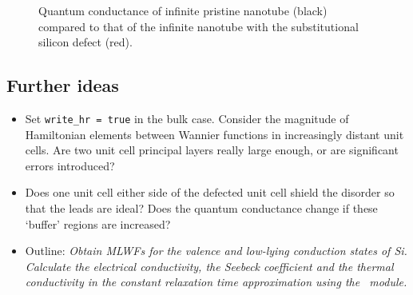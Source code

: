 \documentclass[a4paper,11pt,twoside]{article}
\begin{document}
\begin{figure}[h]
\begin{center}
\caption{Quantum conductance of infinite pristine nanotube (black) 
compared to that of the infinite nanotube with the substitutional silicon 
defect (red).}
\label{fig:cnt_qc}
\end{center}
\end{figure}

\subsection*{Further ideas}
\begin{itemize}
\item Set {\tt write\_hr = true} in the bulk case. Consider the magnitude of Hamiltonian 
	elements between Wannier functions in increasingly distant unit cells. Are two 
	unit cell principal layers really large enough, or are significant errors introduced?
\item Does one unit cell either side of the defected unit cell shield the disorder
	so that the leads are ideal? Does the quantum conductance change if these 
	`buffer' regions are increased?
\end{itemize}


\begin{itemize}
\item{Outline: \it{Obtain MLWFs for the valence and low-lying
    conduction states of Si. Calculate the electrical conductivity, the
    Seebeck coefficient and the thermal conductivity in the constant
    relaxation time approximation using the \bw\ module.}} 
\end{itemize}
\end{document}
